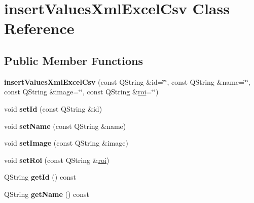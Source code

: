 \hypertarget{classinsertValuesXmlExcelCsv}{}\section{insert\+Values\+Xml\+Excel\+Csv Class Reference}
\label{classinsertValuesXmlExcelCsv}
\subsection*{Public Member Functions}
\begin{DoxyCompactItemize}
\item 
{\bfseries insert\+Values\+Xml\+Excel\+Csv} (const Q\+String \&id=\char`\"{}\char`\"{}, const Q\+String \&name=\char`\"{}\char`\"{}, const Q\+String \&image=\char`\"{}\char`\"{}, const Q\+String \&\hyperlink{classroi}{roi}=\char`\"{}\char`\"{})\hypertarget{classinsertValuesXmlExcelCsv_a35ec76cc1fe92d4c3b7c25bcfabb1aef}{}\label{classinsertValuesXmlExcelCsv_a35ec76cc1fe92d4c3b7c25bcfabb1aef}

\item 
void {\bfseries set\+Id} (const Q\+String \&id)\hypertarget{classinsertValuesXmlExcelCsv_a2942a82ebe78fe23e17cae814f725e87}{}\label{classinsertValuesXmlExcelCsv_a2942a82ebe78fe23e17cae814f725e87}

\item 
void {\bfseries set\+Name} (const Q\+String \&name)\hypertarget{classinsertValuesXmlExcelCsv_a980eac29fbaf765d8469311b03906724}{}\label{classinsertValuesXmlExcelCsv_a980eac29fbaf765d8469311b03906724}

\item 
void {\bfseries set\+Image} (const Q\+String \&image)\hypertarget{classinsertValuesXmlExcelCsv_a0b37ebf8c03a13aac35ddb30146b0b7f}{}\label{classinsertValuesXmlExcelCsv_a0b37ebf8c03a13aac35ddb30146b0b7f}

\item 
void {\bfseries set\+Roi} (const Q\+String \&\hyperlink{classroi}{roi})\hypertarget{classinsertValuesXmlExcelCsv_ae232125e9a588e1fb49620036ba3a144}{}\label{classinsertValuesXmlExcelCsv_ae232125e9a588e1fb49620036ba3a144}

\item 
Q\+String {\bfseries get\+Id} () const \hypertarget{classinsertValuesXmlExcelCsv_afbf975bb77cf34463fa94381ed685b68}{}\label{classinsertValuesXmlExcelCsv_afbf975bb77cf34463fa94381ed685b68}

\item 
Q\+String {\bfseries get\+Name} () const \hypertarget{classinsertValuesXmlExcelCsv_abddb61f5520555149bf08ec4d00d7f68}{}\label{classinsertValuesXmlExcelCsv_abddb61f5520555149bf08ec4d00d7f68}


\end{DoxyCompactItemize}
